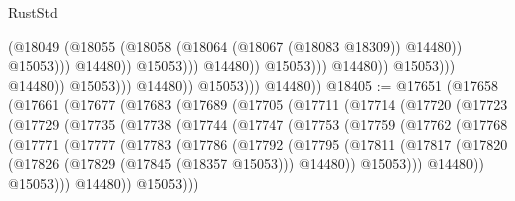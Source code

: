 \begin{lexlean}{RustStd}
\begin{coremodule}
                                                            (@18049
                                                              (@18055
                                                                (@18058
                                                                  (@18064
                                                                    (@18067 (@18083 @18309))
                                                                    @14480))
                                                                @15053)))
                                                          @14480))
                                                      @15053)))
                                                @14480))
                                            @15053)))
                                      @14480))
                                  @15053)))
                            @14480))
                        @15053)))
                  @14480))
              @15053)))
        @14480))
@18405 := @17651
    (@17658
      (@17661
        (@17677
          (@17683
            (@17689
              (@17705
                (@17711
                  (@17714
                    (@17720
                      (@17723
                        (@17729
                          (@17735
                            (@17738
                              (@17744
                                (@17747
                                  (@17753
                                    (@17759
                                      (@17762
                                        (@17768
                                          (@17771
                                            (@17777
                                              (@17783
                                                (@17786
                                                  (@17792
                                                    (@17795
                                                      (@17811
                                                        (@17817
                                                          (@17820
                                                            (@17826
                                                              (@17829 (@17845 (@18357 @15053)))
                                                              @14480))
                                                          @15053)))
                                                    @14480))
                                                @15053)))
                                          @14480))
                                      @15053)))

\end{coremodule}
\end{lexlean}
